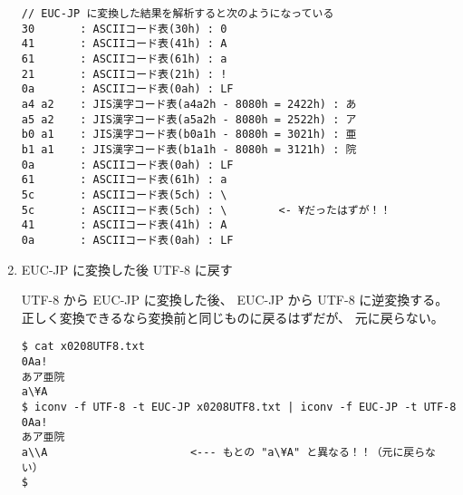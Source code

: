 \documentclass[a4j,dvipdfmx]{jarticle}
\begin{document}
\begin{enumerate}
\begin{lstlisting}
// EUC-JP に変換した結果を解析すると次のようになっている
30       : ASCIIコード表(30h) : 0
41       : ASCIIコード表(41h) : A
61       : ASCIIコード表(61h) : a
21       : ASCIIコード表(21h) : !
0a       : ASCIIコード表(0ah) : LF
a4 a2    : JIS漢字コード表(a4a2h - 8080h = 2422h) : あ
a5 a2    : JIS漢字コード表(a5a2h - 8080h = 2522h) : ア
b0 a1    : JIS漢字コード表(b0a1h - 8080h = 3021h) : 亜
b1 a1    : JIS漢字コード表(b1a1h - 8080h = 3121h) : 院
0a       : ASCIIコード表(0ah) : LF
61       : ASCIIコード表(61h) : a
5c       : ASCIIコード表(5ch) : \
5c       : ASCIIコード表(5ch) : \        <- ¥だったはずが！！
41       : ASCIIコード表(41h) : A
0a       : ASCIIコード表(0ah) : LF
\end{lstlisting}

\item EUC-JP に変換した後 UTF-8 に戻す

UTF-8 から EUC-JP に変換した後、
EUC-JP から UTF-8 に逆変換する。
正しく変換できるなら変換前と同じものに戻るはずだが、
元に戻らない。

\begin{lstlisting}
$ cat x0208UTF8.txt 
0Aa!
あア亜院
a\¥A
$ iconv -f UTF-8 -t EUC-JP x0208UTF8.txt | iconv -f EUC-JP -t UTF-8
0Aa!
あア亜院
a\\A                      <--- もとの "a\¥A" と異なる！！（元に戻らない）
$
\end{lstlisting}

\end{enumerate}
\end{document}
